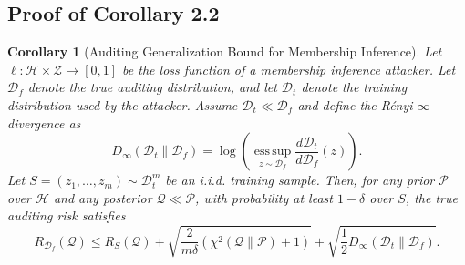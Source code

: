 \documentclass{article}
\theoremstyle{plain}
\newtheorem{corollary}[theorem]{Corollary}
\theoremstyle{definition}
\theoremstyle{remark}
\begin{document}
\subsection{Proof of Corollary 2.2}\label{C2.2}

\begin{corollary}[Auditing Generalization Bound for Membership Inference]
Let $\ell: \mathcal{H} \times \mathcal{Z} \to [0,1]$ be the loss function of a membership inference attacker. Let $\mathcal{D}_f$ denote the true auditing distribution, and let $\mathcal{D}_t$ denote the training distribution used by the attacker. Assume $\mathcal{D}_t \ll \mathcal{D}_f$ and define the Rényi-$\infty$ divergence as
\begin{equation}
    D_\infty(\mathcal{D}_t \| \mathcal{D}_f) = \log \left( \operatorname*{ess\,sup}_{z \sim \mathcal{D}_f} \frac{d\mathcal{D}_t}{d\mathcal{D}_f}(z) \right).
\end{equation}
Let $S = (z_1, \dots, z_m) \sim \mathcal{D}_t^m$ be an i.i.d. training sample. Then, for any prior $\mathcal{P}$ over $\mathcal{H}$ and any posterior $\mathcal{Q} \ll \mathcal{P}$, with probability at least $1 - \delta$ over $S$, the true auditing risk satisfies
\begin{equation}
    R_{\mathcal{D}_f}(\mathcal{Q}) \leq R_S(\mathcal{Q}) + \sqrt{ \frac{2}{m\delta} \left( \chi^2(\mathcal{Q} \| \mathcal{P}) + 1 \right)  } + \sqrt{ \frac{1}{2} D_\infty(\mathcal{D}_t \| \mathcal{D}_f) }.
\end{equation}
\end{corollary}
\end{document}
